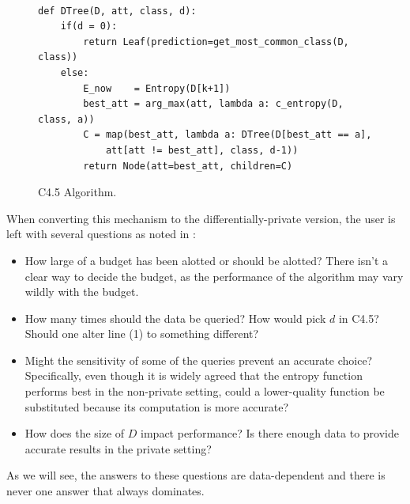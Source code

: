 \documentclass[11pt]{article}
\begin{document}
\begin{figure}
\begin{lstlisting}

def DTree(D, att, class, d):
    if(d = 0):
        return Leaf(prediction=get_most_common_class(D, class))
    else:
        E_now    = Entropy(D[k+1])
        best_att = arg_max(att, lambda a: c_entropy(D, class, a))
        C = map(best_att, lambda a: DTree(D[best_att == a],
            att[att != best_att], class, d-1))
        return Node(att=best_att, children=C)
\end{lstlisting}
\caption{C4.5 Algorithm.}\label{alg:c45}
\end{figure}
When converting this mechanism to the differentially-private version, the user is left with several questions as noted in \cite{Fletcher:2016}:
\begin{itemize}
\item How large of a budget has been alotted or should be alotted? There isn't a clear way to decide the budget, as the performance of the algorithm may vary wildly with the budget.
\item How many times should the data be queried? How would pick $d$ in C4.5? Should one alter line (1) to something different?
\item Might the sensitivity of some of the queries prevent an accurate choice? Specifically, even though it is widely agreed that the entropy function performs best in the non-private setting, could a lower-quality function be substituted because its computation is more accurate?
\item How does the size of $D$ impact performance? Is there enough data to provide accurate results in the private setting?
\end{itemize}
As we will see, the answers to these questions are data-dependent and there is never one answer that always dominates.
\end{document}
